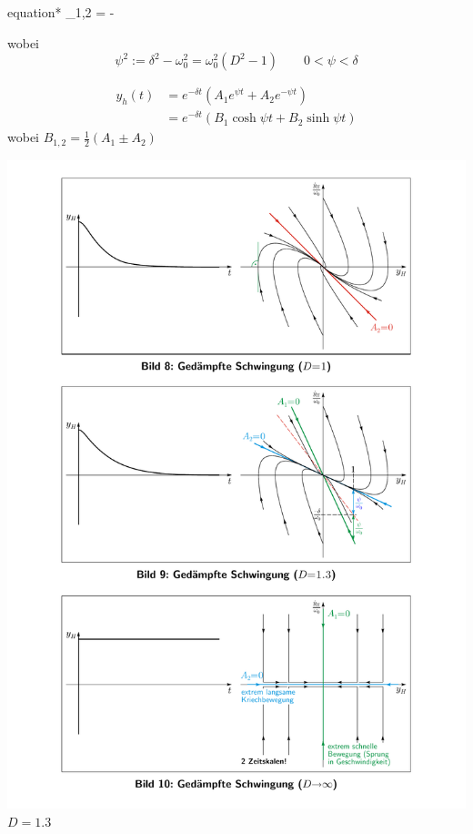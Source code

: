 \documentclass[9pt,fleqn,ngerman,article]{memoir}
\begin{document}
\begin{multicols*}{3}
					\begin{empheq}[box=\shadowbox*]{equation*}
						\lambda_{1,2} = - \delta \pm \psi
					\end{empheq}
					wobei
					\[
						\psi^2 := \delta^2 - \omega_0^2 = \omega_0^2 (D^2 - 1) \qquad 0 < \psi < \delta
					\]
					
					\begin{align*}
						y_h(t) &= e^{-\delta t} (A_1 e^{\psi t} + A_2 e^{-\psi t}) \\
						&= e^{-\delta t} (B_1 \cosh \psi t + B_2 \sinh \psi t)
					\end{align*}
					wobei $B_{1,2} = \frac{1}{2}(A_1 \pm A_2)$
					
					\begin{center}
						\includegraphics[width=\columnwidth]{grafiken/daempfung_d_g1}
						$D = 1.3$
					\end{center}
					

\end{multicols*}
\end{document}
